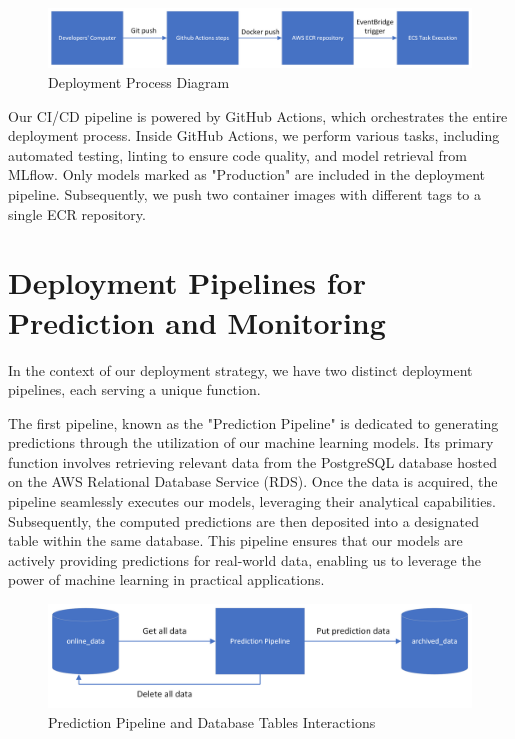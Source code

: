 \documentclass{report}
\begin{document}
\begin{figure}[h]
\centering
\includegraphics[width=\textwidth]{Deployment_process.png}
\caption{Deployment Process Diagram}
\label{fig:system-architecture}
\end{figure}

Our CI/CD pipeline is powered by GitHub Actions, which orchestrates the entire deployment process. Inside GitHub Actions, we perform various tasks, including automated testing, linting to ensure code quality, and model retrieval from MLflow. Only models marked as "Production" are included in the deployment pipeline. Subsequently, we push two container images with different tags to a single ECR repository.

\section{Deployment Pipelines for Prediction and Monitoring}

In the context of our deployment strategy, we have two distinct deployment pipelines, each serving a unique function.

The first pipeline, known as the "Prediction Pipeline" is dedicated to generating predictions through the utilization of our machine learning models. Its primary function involves retrieving relevant data from the PostgreSQL database hosted on the AWS Relational Database Service (RDS). Once the data is acquired, the pipeline seamlessly executes our models, leveraging their analytical capabilities. Subsequently, the computed predictions are then deposited into a designated table within the same database. This pipeline ensures that our models are actively providing predictions for real-world data, enabling us to leverage the power of machine learning in practical applications.

\begin{figure}[H]
    \centering
    \includegraphics[width=0.8\linewidth]{prediction_pipeline.png}
    \caption{Prediction Pipeline and Database Tables Interactions}
    \label{fig:prediction_pipeline}
\end{figure}
\end{document}
